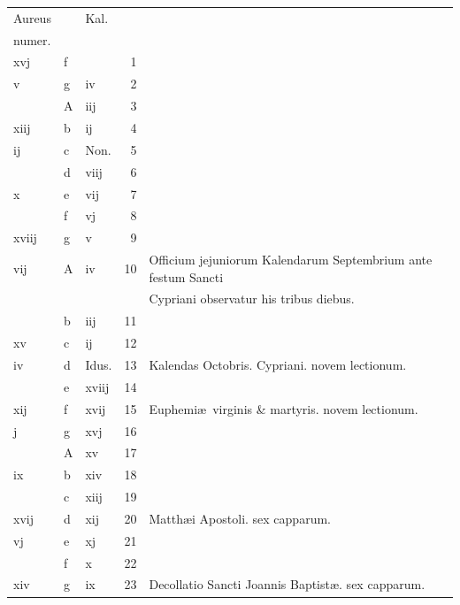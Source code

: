 \documentclass[letter,11pt]{book}
\begin{document}
\begin{center}
\begin{tabular}{l | l | l | r | l}
\color{Red}Aureus & & \color{Red} Kal. & \\
\color{Red}numer. & & & \\
\color{Red} xvj & f & & 1 & \\
\color{Red} v & g & \color{Red} iv & 2 & \\
\color{Red}  & \color{Red} A & \color{Red} iij & 3 & \\
\color{Red} xiij & b & \color{Red} ij & 4 & \\
\color{Red} ij & c & Non. & 5 & \\
\color{Red}  & d & \color{Red} viij & 6 & \\
\color{Red} x & e & \color{Red} vij & 7 & \\
\color{Red}  & f & \color{Red} vj & 8 & \\
\color{Red} xviij & g & \color{Red} v & 9 & \\
\color{Red} vij & \color{Red} A & \color{Red} iv & 10 & Officium jejuniorum Kalendarum Septembrium ante festum Sancti \\
\color{Red}  & & & & \quad Cypriani observatur his tribus diebus. \\
\color{Red}  & b & \color{Red} iij & 11 & \\
\color{Red} xv & c & \color{Red} ij & 12 & \\
\color{Red} iv & d & Idus. & 13 & \qquad \color{Red} Kalendas Octobris. \color{black} Cypriani. \color{Red} novem lectionum. \\
\color{Red}  & e & \color{Red} xviij & 14 & \\
\color{Red} xij & f & \color{Red} xvij & 15 & Euphemi\ae \ virginis \& martyris. \color{Red} novem lectionum. \\
\color{Red} j & g & \color{Red} xvj & 16 & \\
\color{Red}  & \color{Red} A & \color{Red} xv & 17 & \\
\color{Red} ix & b & \color{Red} xiv & 18 & \\
\color{Red}  & c & \color{Red} xiij & 19 & \\
\color{Red} xvij & d & \color{Red} xij & 20 & \color{Red} Matth\ae i Apostoli. \color{black} sex capparum. \\
\color{Red} vj & e & \color{Red} xj & 21 & \\
\color{Red}  & f & \color{Red} x & 22 & \\
\color{Red} xiv & g & \color{Red} ix & 23 & Decollatio Sancti Joannis Baptist\ae . \color{Red} sex capparum. \\

\end{tabular}
\end{center}
\end{document}
